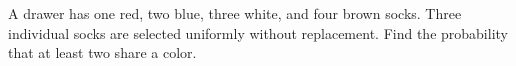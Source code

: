 A drawer has one red, two blue, three white, and four brown socks. Three individual socks are selected uniformly without replacement. Find the probability that at least two share a color.
